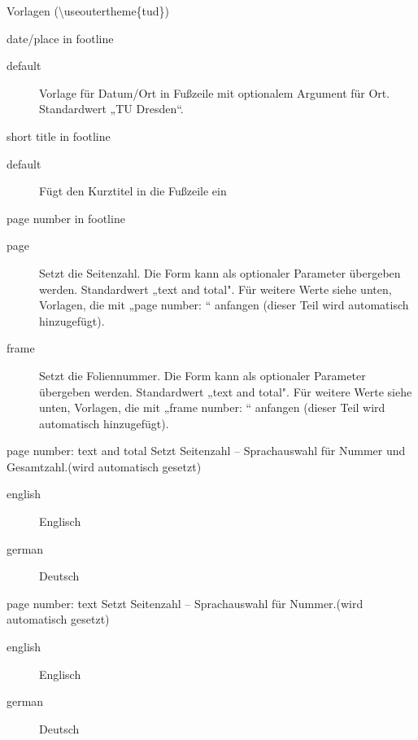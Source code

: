 \documentclass[presentation,t]{beamer}
\begin{document}
\begin{frame}[allowframebreaks,label=sec-2-2-4]{Vorlagen (\textbackslash useoutertheme\{tud\})}
\begin{block}{date/place in footline}

\begin{description}
\item[{default}] Vorlage für Datum/Ort in Fußzeile mit optionalem Argument
für Ort. Standardwert „TU Dresden“.
\end{description}
\end{block}

\begin{block}{short title in footline}

\begin{description}
\item[{default}] Fügt den Kurztitel in die Fußzeile ein
\end{description}
\end{block}

\begin{block}{page number in footline}
\small
\begin{description}
\item[{page}] Setzt die Seitenzahl. Die Form kann als optionaler Parameter
übergeben werden. Standardwert „text and total". Für weitere Werte
siehe unten, Vorlagen, die mit „page number: “ anfangen (dieser Teil
wird automatisch hinzugefügt).
\item[{frame}] Setzt die Foliennummer. Die Form kann als optionaler Parameter
übergeben werden. Standardwert „text and total". Für weitere Werte
siehe unten, Vorlagen, die mit „frame number: “ anfangen (dieser Teil
wird automatisch hinzugefügt).
\end{description}
\end{block}

\begin{block}{page number: text and total}
Setzt Seitenzahl – Sprachauswahl für Nummer und Gesamtzahl.(wird automatisch gesetzt)
\begin{description}
\item[{english}] Englisch
\item[{german}] Deutsch
\end{description}
\end{block}

\begin{block}{page number: text}
Setzt Seitenzahl – Sprachauswahl für Nummer.(wird automatisch gesetzt)
\begin{description}
\item[{english}] Englisch
\item[{german}] Deutsch
\end{description}
\end{block}


\end{frame}
\end{document}
